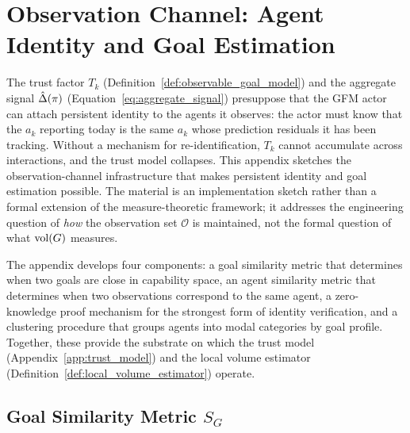 %

\section{Observation Channel: Agent Identity and Goal Estimation}
\label{app:agent_similarity}

The trust factor $T_k$ (Definition~\ref{def:observable_goal_model}) and the
aggregate signal $\hat{\Delta}(\pi)$ (Equation~\eqref{eq:aggregate_signal})
presuppose that the GFM actor can attach persistent identity to the agents it
observes: the actor must know that the $a_k$ reporting today is the same $a_k$
whose prediction residuals it has been tracking. Without a mechanism for
re-identification, $T_k$ cannot accumulate across interactions, and the trust
model collapses. This appendix sketches the observation-channel infrastructure
that makes persistent identity and goal estimation possible. The material is an
implementation sketch rather than a formal extension of the measure-theoretic
framework; it addresses the engineering question of \emph{how} the observation
set $\mathcal{O}$ is maintained, not the formal question of what $\operatorname{vol}(G)$
measures.

The appendix develops four components: a goal similarity metric that determines
when two goals are close in capability space, an agent similarity metric that
determines when two observations correspond to the same agent, a
zero-knowledge proof mechanism for the strongest form of identity verification,
and a clustering procedure that groups agents into modal categories by goal
profile. Together, these provide the substrate on which the trust model
(Appendix~\ref{app:trust_model}) and the local volume estimator
(Definition~\ref{def:local_volume_estimator}) operate.


\subsection{Goal Similarity Metric \texorpdfstring{$S_G$}{S\_G}}
\label{app:goal_similarity}

